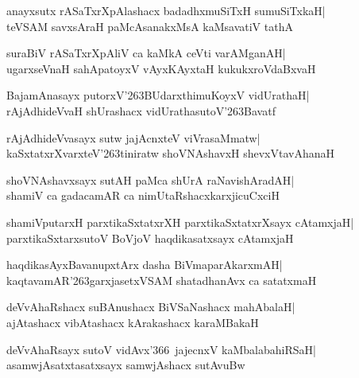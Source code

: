 \documentclass[twoside,12pt,openright]{book}
\def\S{\char'263}
\newcounter{shloka}[chapter]
\begin{document}
\begin{shloka}%
anayxsutx rASaTxrXpAlashacx badadhxmuSiTxH sumuSiTxkaH|\\
teVSAM savxsAraH paMcAsanakxMsA kaMsavatiV tathA
\end{shloka}

\begin{shloka}%
suraBiV rASaTxrXpAliV ca kaMkA ceVti varAMganAH|\\
ugarxseVnaH sahApatoyxV vAyxKAyxtaH kukukxroVdaBxvaH
\end{shloka}

\begin{shloka}%
BajamAnasayx putorxV\S BUdarxthimuKoyxV vidUrathaH|\\
rAjAdhideVvaH shUrashacx vidUrathasutoV\S Bavatf
\end{shloka}

\begin{shloka}%
rAjAdhideVvasayx sutw jajAcnxteV viVrasaMmatw|\\
kaSxtatxrXvarxteV\S tiniratw shoVNAshavxH shevxVtavAhanaH
\end{shloka}

\begin{shloka}%
shoVNAshavxsayx sutAH paMca shUrA raNavishAradAH|\\
shamiV ca gadacamAR ca nimUtaRshacxkarxjicuCxciH
\end{shloka}

\begin{shloka}%
shamiVputarxH parxtikaSxtatxrXH parxtikaSxtatxrXsayx cAtamxjaH|\\
parxtikaSxtarxsutoV BoVjoV haqdikasatxsayx cAtamxjaH
\end{shloka}

\begin{shloka}%
haqdikasAyxBavanupxtArx dasha BiVmaparAkarxmAH|\\
kaqtavamAR\S garxjasetxVSAM shatadhanAvx ca satatxmaH
\end{shloka}

\begin{shloka}%
deVvAhaRshacx suBAnushacx BiVSaNashacx mahAbalaH|\\
ajAtashacx vibAtashacx kArakashacx karaMBakaH
\end{shloka}

\begin{shloka}%
deVvAhaRsayx sutoV vidAvx\char'366\ jajecnxV kaMbalabahiRSaH|\\
asamwjAsatxtasatxsayx samwjAshacx sutAvuBw
\end{shloka}
\end{document}
